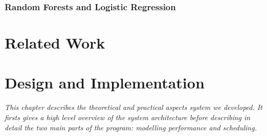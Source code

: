 \documentclass[a4paper,12pt,twoside,openright]{report}
\begin{document}
\subsection{Random Forests and Logistic Regression}









\chapter{Related Work} 










\chapter{Design and Implementation} 



\textit{This chapter describes the theoretical and practical aspects system we developed. It firsts gives a high level overview of the system architecture before describing in detail the two main parts of the program: modelling performance and scheduling.}
\end{document}
